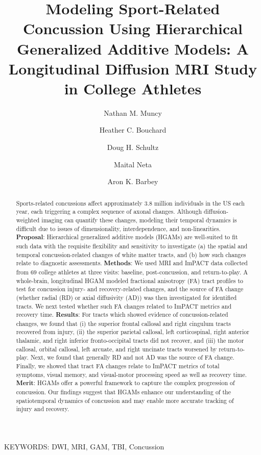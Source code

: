 \documentclass[12pt]{article}
\title{Modeling Sport-Related Concussion Using Hierarchical Generalized Additive Models: A Longitudinal Diffusion MRI Study in College Athletes}
\date{}
\author[1,2,*]{Nathan M. Muncy}
\author[1,2]{Heather C. Bouchard}
\author[1,2]{Doug H. Schultz}
\author[1,2]{Maital Neta}
\author[1,2]{Aron K. Barbey}
\affil[1]{Center for Brain, Behavior and Biology, University of Nebraska-Lincoln}
\affil[2]{Department of Psychology, University of Nebraska-Lincoln}
\affil[*]{Correspondence: nmuncy2@unl.edu}
\begin{document}
\maketitle
\pagebreak


\begin{abstract}
Sports-related concussions affect approximately 3.8 million individuals in the US each year, each triggering a complex sequence of axonal changes. Although diffusion-weighted imaging can quantify these changes, modeling their temporal dynamics is difficult due to issues of dimensionality, interdependence, and non-linearities. \textbf{Proposal}: Hierarchical generalized additive models (HGAMs) are well-suited to fit such data with the requisite flexibility and sensitivity to investigate (a) the spatial and temporal concussion-related changes of white matter tracts, and (b) how such changes relate to diagnostic assessments. \textbf{Methods}: We used MRI and ImPACT data collected from 69 college athletes at three visits: baseline, post-concussion, and return-to-play. A whole-brain, longitudinal HGAM modeled fractional anisotropy (FA) tract profiles to test for concussion injury- and recovery-related changes, and the source of FA change (whether radial (RD) or axial diffusivity (AD)) was then investigated for identified tracts. We next tested whether such FA changes related to ImPACT metrics and recovery time. \textbf{Results}: For tracts which showed evidence of concussion-related changes, we found that (i) the superior frontal callosal and right cingulum tracts recovered from injury, (ii) the superior parietal callosal, left corticospinal, right anterior thalamic, and right inferior fronto-occipital tracts did not recover, and (iii) the motor callosal, orbital callosal, left arcuate, and right uncinate tracts worsened by return-to-play. Next, we found that generally RD and not AD was the source of FA change. Finally, we showed that tract FA changes relate to ImPACT metrics of total symptoms, visual memory, and visual-motor processing speed as well as recovery time. \textbf{Merit}: HGAMs offer a powerful framework to capture the complex progression of concussion. Our findings suggest that HGAMs enhance our understanding of the spatiotemporal dynamics of concussion and may enable more accurate tracking of injury and recovery.

\end{abstract}

\vfill
KEYWORDS: DWI, MRI, GAM, TBI, Concussion\\
\pagebreak
\end{document}

